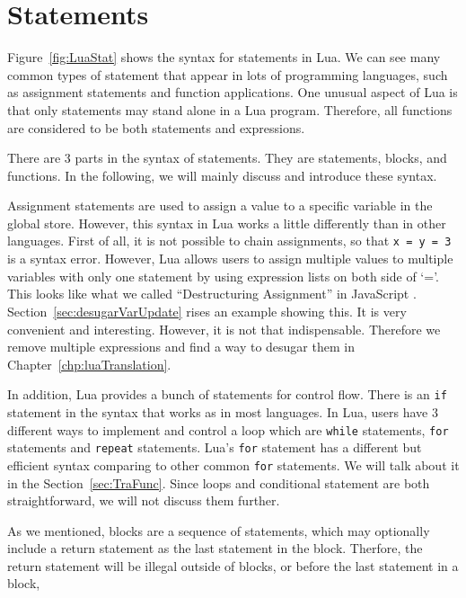 \section{Statements}
Figure~\ref{fig:LuaStat} shows the syntax for statements in Lua. We can see many common types of statement that appear in lots of programming languages, such as assignment statements and function applications.
One unusual aspect of Lua is that only statements may stand alone in a Lua program.
Therefore, all functions are considered to be both statements and expressions.

There are 3 parts in the syntax of statements. They are statements, blocks, and functions. 
In the following, we will mainly discuss and introduce these syntax.

Assignment statements are used to assign a value to a specific variable in the global store.
However, this syntax in Lua works a little differently than in other languages.
First of all, it is not possible to chain assignments, so that {\tt x = y = 3} is a syntax error.
However, Lua allows users to assign multiple values to multiple variables with only one statement by using expression lists on both side of `='. 
This looks like what we called ``Destructuring Assignment'' in JavaScript \cite{DA}. 
Section~\ref{sec:desugarVarUpdate} rises an example showing this. It is very convenient and interesting. 
However, it is not that indispensable. Therefore we remove multiple expressions and find a way to desugar them in Chapter~\ref{chp:luaTranslation}.

In addition, Lua provides a bunch of statements for control flow. There is an {\tt if} statement in the syntax that works as in most languages.
In Lua, users have 3 different ways to implement and control a loop which are {\tt while} statements, {\tt for} statements and {\tt repeat} statements. Lua's {\tt for} statement has a different but efficient syntax comparing to other common {\tt for} statements. We will talk about it in the Section~\ref{sec:TraFunc}.
Since loops and conditional statement are both straightforward, we will not discuss them further.

As we mentioned, blocks are a sequence of statements,
which may optionally include a return statement as the last statement in the block.
Therfore, the return statement will be illegal outside of blocks, or before the last statement in a block,

\newcommand{\assign}[2]{{\overline{#1_i}}~{=}~{\overline{#2_j}}}
\newcommand{\doe}[1]{\mbox{\tt do}~#1~{\tt end}}
\newcommand{\ife}[3]{\mbox{\tt if}~{#1}~\mbox{\tt then}~{#2}~\mbox{\tt else}~{#3}~{\tt end}}
\newcommand{\whilee}[2]{\mbox{\tt while}~#1~{\tt do}~#2~{\tt end}}
\newcommand{\repeate}[2]{\mbox{\tt repeat}~#2~{\tt until}~#1~}
\newcommand{\for}[3]{\mbox{\tt for}~#1~=~#2_1,~#2_2,~#2_3~{\tt do}~#3~{\tt end}}
\newcommand{\function}[3]{\mbox{\tt function}~#1({\overline{#2_i}})~#3~{\tt end}}
\newcommand{\local}[2]{\mbox{\tt local}~{\assign #1 #2}}


